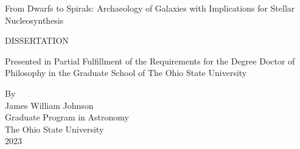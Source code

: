 %
%
%
%
%
%

\begin{titlepage}

%
%


\begin{center}
\begin{singlespace}
\vspace*{1.3cm}
{\Large
From Dwarfs to Spirals: Archaeology of Galaxies with Implications for Stellar
Nucleosynthesis
}
\end{singlespace}

%
%
%
%
%

\vspace*{1.5cm}

DISSERTATION\\
\vspace*{1.5cm}
\begin{singlespace}
Presented in Partial Fulfillment of the Requirements for
the Degree Doctor of Philosophy in the Graduate School of The Ohio 
State University\\
\end{singlespace}
\vspace*{1.0cm}


%
%
%
\begin{doublespace}
By
\\
James William Johnson
\\
Graduate Program in Astronomy
\\
\vspace*{1.0cm}
The Ohio State University\\
2023\\


\end{doublespace}
\end{center}
\end{titlepage}
